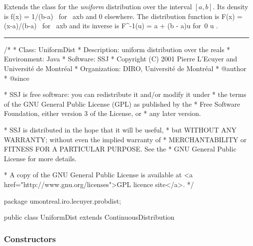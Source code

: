 
Extends the class  for
the {\em uniform\/} distribution \cite[page 276]{tJOH95b}
over the interval $[a,b]$.
Its density is
\eq
  f(x) = 1/(b-a)  \qquad\mbox{ for } a\le x\le b   
\endeq
and 0 elsewhere.  The distribution function is 
\eq
   F(x) = (x-a)/(b-a) \qquad\mbox { for } a\le x\le b
\endeq
and its inverse is
\eq
   F^{-1}(u) = a + (b - a)u
      \qquad\mbox{for }0 \le u .     
\endeq


\bigskip\hrule

\begin{code}
\begin{hide}
/*
 * Class:        UniformDist
 * Description:  uniform distribution over the reals
 * Environment:  Java
 * Software:     SSJ 
 * Copyright (C) 2001  Pierre L'Ecuyer and Université de Montréal
 * Organization: DIRO, Université de Montréal
 * @author       
 * @since

 * SSJ is free software: you can redistribute it and/or modify it under
 * the terms of the GNU General Public License (GPL) as published by the
 * Free Software Foundation, either version 3 of the License, or
 * any later version.

 * SSJ is distributed in the hope that it will be useful,
 * but WITHOUT ANY WARRANTY; without even the implied warranty of
 * MERCHANTABILITY or FITNESS FOR A PARTICULAR PURPOSE.  See the
 * GNU General Public License for more details.

 * A copy of the GNU General Public License is available at
   <a href="http://www.gnu.org/licenses">GPL licence site</a>.
 */
\end{hide}
package umontreal.iro.lecuyer.probdist;


public class UniformDist extends ContinuousDistribution\begin{hide} {
   private double a;
   private double b;
\end{hide}\end{code}
\subsubsection* {Constructors}

